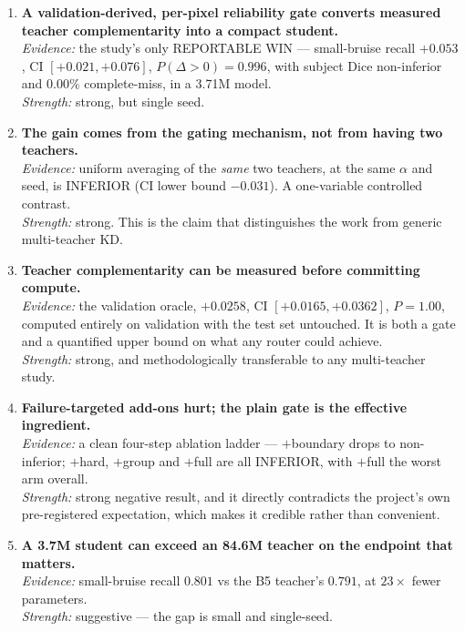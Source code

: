 \documentclass[11pt]{article}
\begin{document}
\begin{enumerate}[leftmargin=1.8em,itemsep=6pt]
  \item \textbf{A validation-derived, per-pixel reliability gate converts measured teacher
  complementarity into a compact student.} \\
  \emph{Evidence:} the study's only REPORTABLE WIN --- small-bruise recall $+0.053$, CI
  $[+0.021,+0.076]$, $P(\Delta>0)=0.996$, with subject Dice non-inferior and $0.00\%$
  complete-miss, in a 3.71M model. \\
  \emph{Strength:} strong, but single seed.

  \item \textbf{The gain comes from the gating mechanism, not from having two teachers.} \\
  \emph{Evidence:} uniform averaging of the \emph{same} two teachers, at the same $\alpha$ and
  seed, is INFERIOR (CI lower bound $-0.031$). A one-variable controlled contrast. \\
  \emph{Strength:} strong. This is the claim that distinguishes the work from generic
  multi-teacher KD.

  \item \textbf{Teacher complementarity can be measured before committing compute.} \\
  \emph{Evidence:} the validation oracle, $+0.0258$, CI $[+0.0165,+0.0362]$, $P=1.00$, computed
  entirely on validation with the test set untouched. It is both a gate and a quantified upper
  bound on what any router could achieve. \\
  \emph{Strength:} strong, and methodologically transferable to any multi-teacher study.

  \item \textbf{Failure-targeted add-ons hurt; the plain gate is the effective ingredient.} \\
  \emph{Evidence:} a clean four-step ablation ladder --- $+$boundary drops to non-inferior;
  $+$hard, $+$group and $+$full are all INFERIOR, with $+$full the worst arm overall. \\
  \emph{Strength:} strong negative result, and it directly contradicts the project's own
  pre-registered expectation, which makes it credible rather than convenient.

  \item \textbf{A 3.7M student can exceed an 84.6M teacher on the endpoint that matters.} \\
  \emph{Evidence:} small-bruise recall $0.801$ vs the B5 teacher's $0.791$, at $23\times$ fewer
  parameters. \\
  \emph{Strength:} suggestive --- the gap is small and single-seed.
\end{enumerate}
\end{document}
